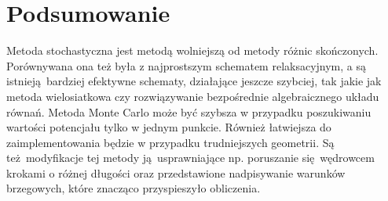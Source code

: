 \documentclass[a4paper, 12pt]{article}
\begin{document}
	\section*{Podsumowanie}
	
	Metoda stochastyczna jest metodą wolniejszą od metody różnic skończonych. 
	Porównywana ona też była z najprostszym schematem relaksacyjnym, a są istnieją bardziej efektywne schematy, działające jeszcze szybciej, tak jakie jak metoda wielosiatkowa czy rozwiązywanie bezpośrednie algebraicznego układu równań. 
	Metoda Monte Carlo może być szybsza w przypadku poszukiwaniu wartości potencjału tylko w jednym punkcie.
	Również łatwiejsza do zaimplementowania będzie w przypadku trudniejszych geometrii. 
	Są też modyfikacje tej metody ją usprawniające np. poruszanie się wędrowcem krokami o różnej długości oraz przedstawione nadpisywanie warunków brzegowych, które znacząco przyspieszyło obliczenia.
	
\end{document}
